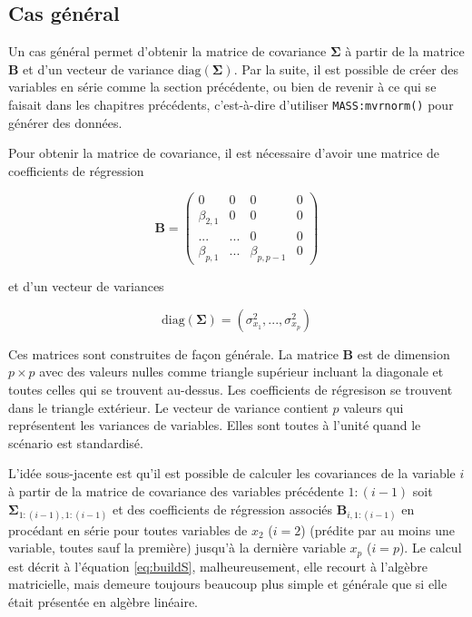 \documentclass[
]{book}
\begin{document}
\hypertarget{cas-guxe9nuxe9ral}{%
\subsection{Cas général}\label{cas-guxe9nuxe9ral}}

Un cas général permet d'obtenir la matrice de covariance \(\mathbf{\Sigma}\) à partir de la matrice \(\mathbf{B}\) et d'un vecteur de variance \(\text{diag}(\mathbf{\Sigma})\). Par la suite, il est possible de créer des variables en série comme la section précédente, ou bien de revenir à ce qui se faisait dans les chapitres précédents, c'est-à-dire d'utiliser \texttt{MASS:mvrnorm()} pour générer des données.

Pour obtenir la matrice de covariance, il est nécessaire d'avoir une matrice de coefficients de régression

\begin{equation}
\mathbf{B} = 
\left( \begin{array}{cccc}
0 & 0 & 0 & 0\\
\beta_{2,1} & 0 & 0 & 0\\
...& ...  & 0 & 0 \\
\beta_{p,1} & ... & \beta_{p,p-1} & 0
\end{array} 
\right)
\label{eq:B2}
\end{equation}

et d'un vecteur de variances

\begin{equation}
\text{diag}(\mathbf{\Sigma}) = \left(\sigma^2_{x_1},...,\sigma^2_{x_p} \right)
\end{equation}

Ces matrices sont construites de façon générale. La matrice \(\mathbf{B}\) est de dimension \(p \times p\) avec des valeurs nulles comme triangle supérieur incluant la diagonale et toutes celles qui se trouvent au-dessus. Les coefficients de régresison se trouvent dans le triangle extérieur. Le vecteur de variance contient \(p\) valeurs qui représentent les variances de variables. Elles sont toutes à l'unité quand le scénario est standardisé.

L'idée sous-jacente est qu'il est possible de calculer les covariances de la variable \(i\) à partir de la matrice de covariance des variables précédente \(1:(i-1)\) soit \(\mathbf{\Sigma}_{1:(i-1),1:(i-1)}\) et des coefficients de régression associés \(\mathbf{B}_{i, 1:(i-1)}\) en procédant en série pour toutes variables de \(x_2\) (\(i=2\)) (prédite par au moins une variable, toutes sauf la première) jusqu'à la dernière variable \(x_p\) (\(i=p\)). Le calcul est décrit à l'équation \eqref{eq:buildS}, malheureusement, elle recourt à l'algèbre matricielle, mais demeure toujours beaucoup plus simple et générale que si elle était présentée en algèbre linéaire.
\end{document}
